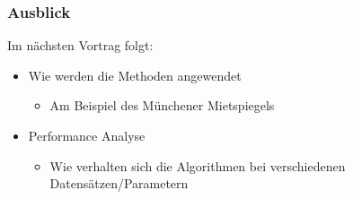 \documentclass{beamer}
\begin{document}
\begin{frame}
  \frametitle{Ausblick}
  
  Im nächsten Vortrag folgt:
  \begin{itemize}
  \item Wie werden die Methoden angewendet
    \begin{itemize}
    \item Am Beispiel des Münchener Mietspiegels
    \end{itemize}
  \item Performance Analyse
    \begin{itemize}
    \item Wie verhalten sich die Algorithmen bei verschiedenen Datensätzen/Parametern 
    \end{itemize}
  \end{itemize}

\end{frame}
\end{document}
